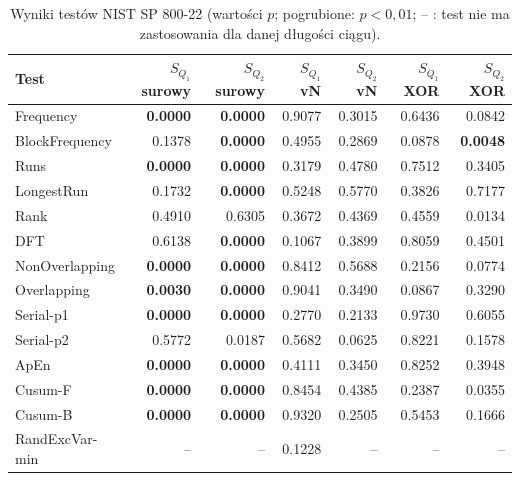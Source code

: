 \begin{table}[htbp]
\centering
\small
\begin{tabular}{lrrrrrr}
\toprule
Test & $S_{Q_1}$ surowy & $S_{Q_2}$ surowy & $S_{Q_1}$ vN & $S_{Q_2}$ vN & $S_{Q_1}$ XOR & $S_{Q_2}$ XOR \\
\midrule
Frequency & \textbf{0.0000} & \textbf{0.0000} & 0.9077 & 0.3015 & 0.6436 & 0.0842 \\
BlockFrequency & 0.1378 & \textbf{0.0000} & 0.4955 & 0.2869 & 0.0878 & \textbf{0.0048} \\
Runs & \textbf{0.0000} & \textbf{0.0000} & 0.3179 & 0.4780 & 0.7512 & 0.3405 \\
LongestRun & 0.1732 & \textbf{0.0000} & 0.5248 & 0.5770 & 0.3826 & 0.7177 \\
Rank & 0.4910 & 0.6305 & 0.3672 & 0.4369 & 0.4559 & 0.0134 \\
DFT & 0.6138 & \textbf{0.0000} & 0.1067 & 0.3899 & 0.8059 & 0.4501 \\
NonOverlapping & \textbf{0.0000} & \textbf{0.0000} & 0.8412 & 0.5688 & 0.2156 & 0.0774 \\
Overlapping & \textbf{0.0030} & \textbf{0.0000} & 0.9041 & 0.3490 & 0.0867 & 0.3290 \\
Serial-p1 & \textbf{0.0000} & \textbf{0.0000} & 0.2770 & 0.2133 & 0.9730 & 0.6055 \\
Serial-p2 & 0.5772 & 0.0187 & 0.5682 & 0.0625 & 0.8221 & 0.1578 \\
ApEn & \textbf{0.0000} & \textbf{0.0000} & 0.4111 & 0.3450 & 0.8252 & 0.3948 \\
Cusum-F & \textbf{0.0000} & \textbf{0.0000} & 0.8454 & 0.4385 & 0.2387 & 0.0355 \\
Cusum-B & \textbf{0.0000} & \textbf{0.0000} & 0.9320 & 0.2505 & 0.5453 & 0.1666 \\
RandExcVar-min & -- & -- & 0.1228 & -- & -- & -- \\
\bottomrule
\end{tabular}
\caption{Wyniki testów NIST SP 800-22 (wartości $p$; pogrubione: $p<0{,}01$; -- : test nie ma zastosowania dla danej długości ciągu).}
\label{tab:eqrng_nist}
\end{table}
